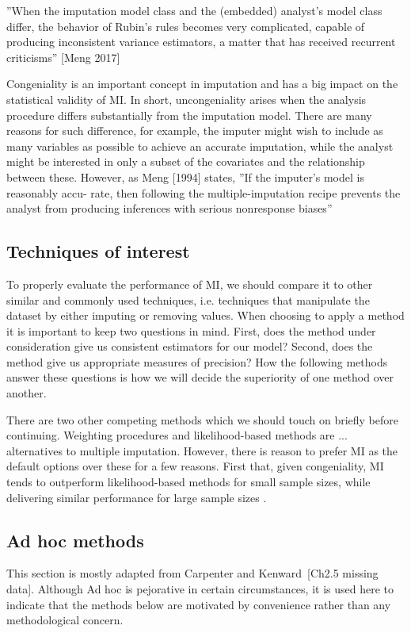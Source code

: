 \documentclass{article}
\begin{document}
	
	''When the imputation model class and the (embedded) analyst’s model class
	differ, the behavior of Rubin’s rules becomes very complicated, capable of producing inconsistent variance estimators, a matter that has received recurrent
	criticisms'' [Meng 2017]
	
	Congeniality is an important concept in imputation and has a big impact on the statistical validity of MI. In short, uncongeniality arises when the analysis procedure differs substantially from the imputation model. There are many reasons for such difference, for example, the imputer might wish to include as many variables as possible to achieve an accurate imputation, while the analyst might be interested in only a subset of the covariates and the relationship between these. However, as Meng [1994] states, ''If the imputer's model is reasonably accu-
	rate, then following the multiple-imputation recipe
	prevents the analyst from producing inferences with
	serious nonresponse biases''
	
	\subsection{Techniques of interest}
	To properly evaluate the performance of MI, we should compare it to other similar and commonly used techniques, i.e. techniques that manipulate the dataset by either imputing or removing values. When choosing to apply a method it is important to keep two questions in mind. First, does the method under consideration give us consistent estimators for our model? Second, does the method give us appropriate measures of precision? How the following methods answer these questions is how we will decide the superiority of one method over another.
	
	There are two other competing methods which we should touch on briefly before continuing. Weighting procedures and likelihood-based methods are ... alternatives to multiple imputation. However, there is reason to prefer MI as the default options over these for a few reasons. First that, given congeniality, MI tends to outperform likelihood-based methods for small sample sizes, while delivering similar performance for large sample sizes \cite{schafer_multiple_2016}.
	
	\subsection{Ad hoc methods}
	This section is mostly adapted from Carpenter and Kenward [Ch2.5 missing data]. Although Ad hoc is pejorative in certain circumstances, it is used here to indicate that the methods below are motivated by convenience rather than any methodological concern.
	
\end{document}

